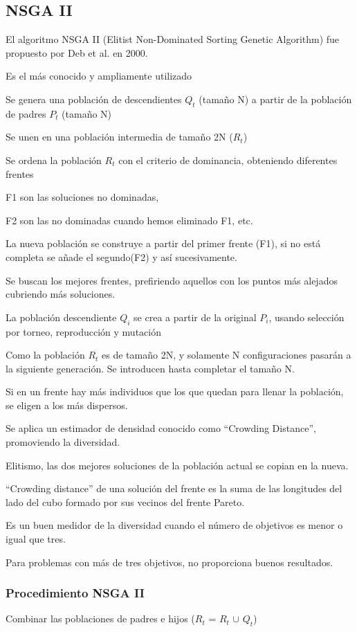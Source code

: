 \documentclass[12pt, twoside, openright]{report} %
\begin{document}
\subsection{NSGA II}
El algoritmo NSGA II (Elitist Non-Dominated Sorting Genetic Algorithm) fue propuesto por Deb et al. en 2000.

Es el más conocido y ampliamente utilizado

Se genera una población de descendientes $Q_t$ (tamaño N) a partir de la población de padres $P_t$ (tamaño N)

Se unen en una población intermedia de tamaño 2N ($R_t$)

Se ordena la población $R_t$ con el criterio de dominancia, obteniendo diferentes frentes

F1 son las soluciones no dominadas,

F2 son las no dominadas cuando hemos eliminado F1, etc.

La nueva población se construye a partir del primer frente (F1), si no está completa se añade el segundo(F2) y así sucesivamente.

Se buscan los mejores frentes, prefiriendo aquellos con los puntos más alejados cubriendo más soluciones.

La población descendiente $Q_i$ se crea a partir de la original $P_i$, usando selección por torneo, reproducción y mutación

Como la población $R_t$ es de tamaño 2N, y solamente N configuraciones pasarán a la siguiente generación. Se introducen hasta completar el tamaño N.

Si en un frente hay más individuos que los que quedan para llenar la población, se eligen a los más dispersos.

Se aplica un estimador de densidad conocido como “Crowding Distance”, promoviendo la diversidad.

Elitismo, las dos mejores soluciones de la población actual se copian en la nueva.

“Crowding distance” de una solución del frente es la suma de las longitudes del lado del cubo formado por sus vecinos del frente Pareto.

Es un buen medidor de la diversidad cuando el número de objetivos es menor o igual que tres.

Para problemas con más de tres objetivos, no proporciona buenos resultados.

\subsubsection{Procedimiento NSGA II}
Combinar las poblaciones de padres e hijos ($R_t$ = $R_t$ $\cup$ $Q_t$)
\end{document}
